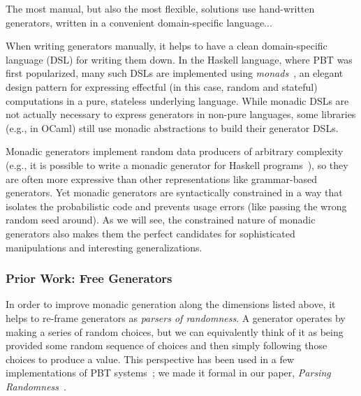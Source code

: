 The most manual, but also the most flexible, solutions use hand-written
generators, written in a convenient domain-specific language...

When writing generators manually, it helps to have a clean domain-specific
language (DSL) for writing them down. In the Haskell language, where PBT was
first popularized, many such DSLs are implemented using {\em
monads\/}~\cite{moggi1991notions}, an elegant design pattern for
expressing effectful (in this case, random and stateful) computations
in a pure, stateless underlying
language. While monadic DSLs are not actually necessary to express generators in
non-pure languages, some libraries (e.g., in OCaml) still use monadic
abstractions to build their generator DSLs.

Monadic generators implement random data producers of arbitrary complexity
(e.g., it is possible to write a monadic generator for Haskell
programs~\cite{palka_testing_2011}), so they are often more expressive than
other representations like grammar-based generators.  Yet monadic generators are
syntactically constrained in a way that isolates the probabilistic code and
prevents usage errors (like passing the wrong random seed around). As we will
see, the constrained nature of monadic generators also makes them the perfect
candidates for sophisticated manipulations and interesting generalizations.

\subsubsection{Prior Work: Free Generators}
In order to improve monadic generation along the dimensions listed
above, it helps to re-frame generators as {\em parsers of randomness}. A generator
operates by making a series of random choices, but we can equivalently think of
it as being provided some random sequence of choices and then simply following
those choices to produce a value. This perspective has been used in a few
implementations of PBT
systems~\cite{maciver2019hypothesis, dolan2017testing}; we made it
formal in our paper, {\em Parsing Randomness}~\cite{goldstein2022parsing}.

